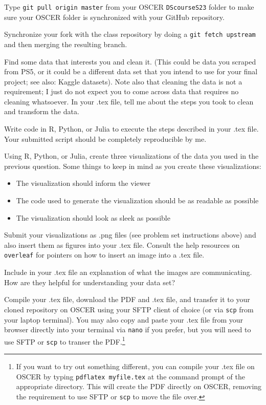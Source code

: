 \documentclass[12pt,english]{exam}
\begin{document}
\begin{questions}
\question Type \texttt{git pull origin master} from your OSCER \texttt{DScourseS23} folder to make sure your OSCER folder is synchronized with your GitHub repository. 

\question Synchronize your fork with the class repository by doing a \texttt{git fetch upstream} and then merging the resulting branch. 

\question Find some data that interests you and clean it. (This could be data you scraped from PS5, or it could be a different data set that you intend to use for your final project; see also: Kaggle datasets). Note also that cleaning the data is not a requirement; I just do not expect you to come across data that requires no cleaning whatsoever. In your .tex file, tell me about the steps you took to clean and transform the data.

Write code in R, Python, or Julia to execute the steps described in your .tex file. Your submitted script should be completely reproducible by me.

\question Using R, Python, or Julia, create three visualizations of the data you used in the previous question. Some things to keep in mind as you create these visualizations:
\begin{itemize}
    \item The visualization should inform the viewer
    \item The code used to generate the visualization should be as readable as possible
    \item The visualization should look as sleek as possible
\end{itemize}

Submit your visualizations as .png files (see problem set instructions above) and also insert them as figures into your .tex file. Consult the help resources on \texttt{overleaf} for pointers on how to insert an image into a .tex file.

\question Include in your .tex file an explanation of what the images are communicating. How are they helpful for understanding your data set?

\question Compile your .tex file, download the PDF and .tex file, and transfer it to your cloned repository on OSCER using your SFTP client of choice (or via \texttt{scp} from your laptop terminal). You may also copy and paste your .tex file from your browser directly into your terminal via \texttt{nano} if you prefer, but you will need to use SFTP or \texttt{scp} to transer the PDF.\footnote{If you want to try out something different, you can compile your .tex file on OSCER by typing \texttt{pdflatex myfile.tex} at the command prompt of the appropriate directory. This will create the PDF directly on OSCER, removing the requirement to use SFTP or \texttt{scp} to move the file over.}


\end{questions}
\end{document}
